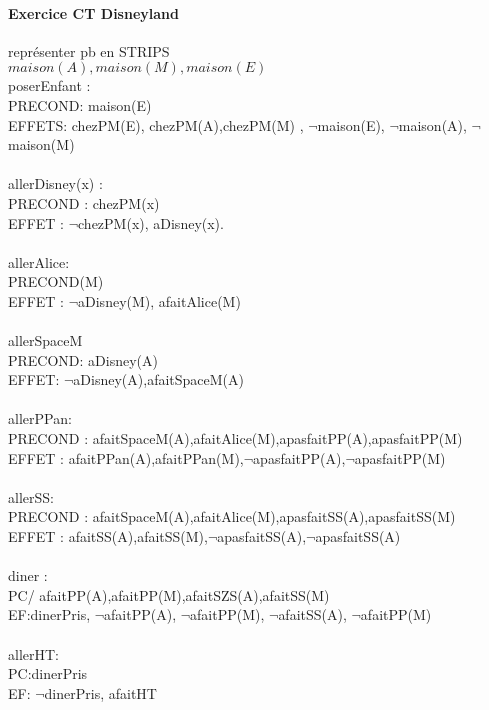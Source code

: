\documentclass{article}
\begin{document}
\paragraph{Exercice CT Disneyland}
représenter pb en STRIPS\\
$maison(A),maison(M),maison(E)$ \\
poserEnfant :\\
PRECOND: maison(E)\\
EFFETS: chezPM(E), chezPM(A),chezPM(M) , $\neg$maison(E), $\neg$maison(A), $\neg$maison(M) \\\\

allerDisney(x) : \\
PRECOND : chezPM(x)\\
EFFET : $ \neg$chezPM(x), aDisney(x).\\\\
allerAlice:\\
PRECOND(M)\\
EFFET : $\neg$aDisney(M), afaitAlice(M)\\\\

allerSpaceM\\
PRECOND: aDisney(A)\\
EFFET: $\neg$aDisney(A),afaitSpaceM(A)\\\\

allerPPan:\\
PRECOND : afaitSpaceM(A),afaitAlice(M),apasfaitPP(A),apasfaitPP(M)\\
EFFET : afaitPPan(A),afaitPPan(M),$\neg$apasfaitPP(A),$\neg$apasfaitPP(M)\\\\


allerSS:\\
PRECOND : afaitSpaceM(A),afaitAlice(M),apasfaitSS(A),apasfaitSS(M)\\
EFFET : afaitSS(A),afaitSS(M),$\neg$apasfaitSS(A),$\neg$apasfaitSS(A)\\\\

diner :\\
PC/ afaitPP(A),afaitPP(M),afaitSZS(A),afaitSS(M)\\
EF:dinerPris, $\neg$afaitPP(A), $\neg$afaitPP(M), $\neg$afaitSS(A), $\neg$afaitPP(M)\\\\

allerHT:\\
PC:dinerPris\\
EF: $\neg$dinerPris, afaitHT
\end{document}
